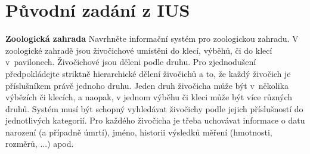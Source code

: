 \section{Původní zadání z IUS}
\thispagestyle{fancy}
\begin{centering}
\textbf{Zoologická zahrada} \newline \newline
Navrhněte informační systém pro zoologickou zahradu. V zoologické zahradě jsou živočichové umístěni do klecí, výběhů, či do klecí v~pavilonech. Živočichové jsou děleni podle druhu. Pro zjednodušení předpokládejte striktně hierarchické dělení živočichů a to, že každý živočich je příslušníkem právě jednoho druhu. Jeden druh živočicha může být v~několika výbězích či klecích, a naopak, v jednom výběhu či kleci může být více různých druhů. Systém musí být schopný vyhledávat živočichy podle jejich příslušností do jednotlivých kategorií. Pro každého živočicha je třeba uchovávat informace o datu narození (a případně úmrtí), jméno, historii výsledků měření (hmotnosti, rozměrů, ...) apod.
\end{centering}
